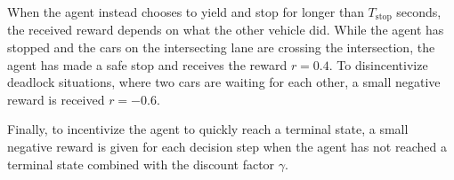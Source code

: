 When the agent instead chooses to yield and stop for longer than $T_\mathrm{stop}$ seconds, the received reward depends on what the other vehicle did. 
While the agent has stopped and the cars on the intersecting lane are crossing the intersection, the agent has made a safe stop and receives the reward $r=0.4$. To disincentivize deadlock situations, where two cars are waiting for each other, a small negative reward is received $r=-0.6$. 

Finally, to incentivize the agent to quickly reach a terminal state, a small negative reward is given for each decision step when the agent has not reached a terminal state combined with the discount factor $\gamma$. 





